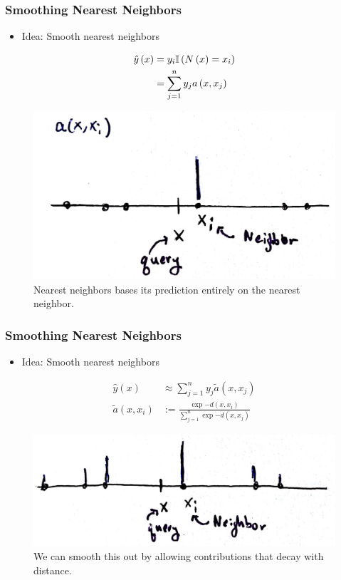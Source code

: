 \documentclass[10pt,mathserif]{beamer}
\begin{document}
\begin{frame}
  \frametitle{Smoothing Nearest Neighbors}
 \begin{itemize}
 \item Idea: Smooth nearest neighbors
 \end{itemize} 
 \begin{align}
   \hat{y}\left(x\right) &= y_i \mathbb{I}\left({N\left(x\right) = x_i}\right) \\
   &= \sum_{j = 1}^{n} y_j a\left(x, x_j\right)
 \end{align} 
\begin{figure}[ht]
  \centering
  \includegraphics[width=0.65\paperwidth]{figure/hard_a_fun}
  \caption{Nearest neighbors bases its prediction entirely on the nearest
    neighbor. \label{fig:hard_a_fun} }
\end{figure}

\end{frame}

\begin{frame}
  \frametitle{Smoothing Nearest Neighbors}
 \begin{itemize}
 \item Idea: Smooth nearest neighbors
 \end{itemize} 
 \begin{align}
   \hat{y}\left(x\right) &\approx \sum_{j = 1}^{n} y_j \tilde{a}\left(x, x_j\right) \\
   \tilde{a}\left(x, x_i\right) &:= \frac{\exp{-d\left(x, x_i\right)}}{\sum_{j = 1}^{n} \exp{-d\left(x, x_j\right)}}
 \end{align} 
\begin{figure}[ht]
  \centering
  \includegraphics[width=0.65\paperwidth]{figure/soft_a_fun}
  \caption{We can smooth this out by allowing contributions that decay with
    distance. \label{fig:soft_a_fun} }
\end{figure}
\end{frame}
\end{document}
